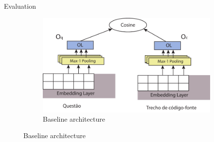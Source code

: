 \documentclass{beamer}
\begin{document}
\begin{frame}{Evaluation}
\begin{figure}
          \begin{subfigure}[h]{0.45\textwidth}
            \includegraphics[width=\textwidth]{resources/embedding-architecture.pdf}
            \caption{Baseline architecture}
            \label{fig:baseline-one-architecture}
          \end{subfigure}
        \end{figure}
    \end{frame}
\end{document}
